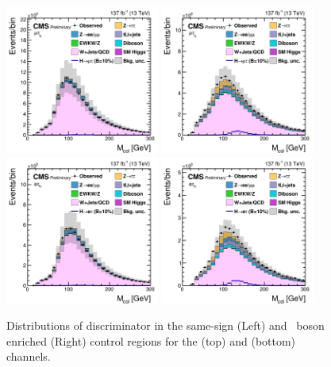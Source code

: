 \begin{figure}[htbp!]
  \centering
  \includegraphics[width=0.45\textwidth]{plots/chapter7/Fake/mutau/SS.png}
  \includegraphics[width=0.45\textwidth]{plots/chapter7/Fake/mutau/WOS.png}
  \includegraphics[width=0.45\textwidth]{plots/chapter7/Fake/etau/SS.png}
  \includegraphics[width=0.45\textwidth]{plots/chapter7/Fake/etau/WOS.png}
  \caption{Distributions of \mcol discriminator in the same-sign (Left) and \PW\, boson enriched (Right) control regions for the \Hmuhad (top) and \Hehad (bottom) channels.}
  \label{fig:fake_control}
\end{figure}

